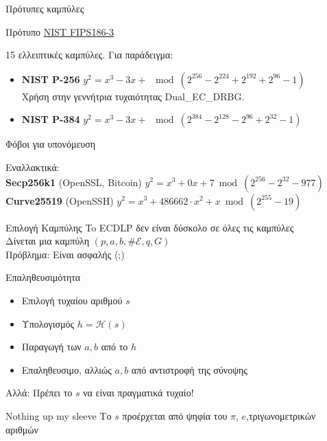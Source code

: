\documentclass[handout]{beamer}
\begin{document}
\begin{frame}{Πρότυπες καμπύλες}
\begin{small}
\begin{block}{Πρότυπο \href{http://csrc.nist.gov/publications/fips/fips186-3/fips_186-3.pdf}{NIST FIPS186-3}}

15 ελλειπτικές καμπύλες. Για παράδειγμα:

\begin{itemize}  
\item \textbf{NIST P-256}
$y^2 = x^3-3x+$ $\bmod ( 2^{256} - 2^{224} + 2^{192} + 2^{96} - 1) $\\
\pause
Χρήση στην γεννήτρια τυχαιότητας Dual\_EC\_DRBG.
\pause
\item \textbf{NIST P-384 }
$y^2 = x^3-3x+$ $\bmod
  (2^{384}- 2^{128} - 2^{96} + 2^{32} - 1) $
\end{itemize}

\alert{Φόβοι για υπονόμευση}
\end{block}
\pause
Εναλλακτικά:\\
\textbf{Secp256k1}  (OpenSSL, Bitcoin) $y^2 = x^3+0x+7 \bmod (2^{256} - 2^{32} - 977)$ \\
\textbf{Curve25519} (OpenSSH) $y^2 = x^3+486662 \cdot x^2+x \bmod (2^{255}-19) $
\end{small}
\end{frame}



\begin{frame}{Επιλογή Καμπύλης}
\alert{To ECDLP δεν είναι δύσκολο σε όλες τις καμπύλες}\\
\pause
Δίνεται μια καμπύλη $(p,a,b,\# \mathcal{E},q,G)$\\
\alert{Πρόβλημα:} Είναι ασφαλής (;)
\pause
\begin{block}{Επαληθευσιμότητα}
\begin{itemize}
\item Επιλογή τυχαίου αριθμού $s$
\item Υπολογισμός $h=\mathcal{H}(s)$
\item Παραγωγή των $a,b$ από το $h$
\item Επαληθευσιμο, αλλιώς $a,b$ από αντιστροφή της σύνοψης
\end{itemize}
\end{block}
\pause
\alert{Αλλά:} Πρέπει το $s$ να είναι πραγματικά τυχαίο!
\begin{block}{Nothing up my sleeve}
Το $s$ προέρχεται από ψηφία του $\pi$, $e$,τριγωνομετρικών αριθμών
\end{block}
\end{frame}
\end{document}
